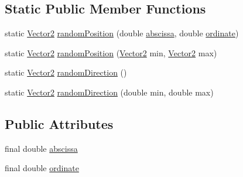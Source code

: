 \subsection*{Static Public Member Functions}
\begin{DoxyCompactItemize}
\item 
static \mbox{\hyperlink{class_vector2}{Vector2}} \mbox{\hyperlink{class_vector2_ac428f5ec5017a6c4a2ec850bcd95fea3}{random\+Position}} (double \mbox{\hyperlink{class_vector2_aadec5169cf1887537f1c7d60f87e137f}{abscissa}}, double \mbox{\hyperlink{class_vector2_a11433891ace979aadcb1c8c8612c29a3}{ordinate}})
\item 
static \mbox{\hyperlink{class_vector2}{Vector2}} \mbox{\hyperlink{class_vector2_af7e6ce10063a75db5bba6eac52dfe790}{random\+Position}} (\mbox{\hyperlink{class_vector2}{Vector2}} min, \mbox{\hyperlink{class_vector2}{Vector2}} max)
\item 
static \mbox{\hyperlink{class_vector2}{Vector2}} \mbox{\hyperlink{class_vector2_a139f45c8088a42e3971e6614aa62a8aa}{random\+Direction}} ()
\item 
static \mbox{\hyperlink{class_vector2}{Vector2}} \mbox{\hyperlink{class_vector2_abf982a5300ee21200b1021e27de420ab}{random\+Direction}} (double min, double max)
\end{DoxyCompactItemize}
\subsection*{Public Attributes}
\begin{DoxyCompactItemize}
\item 
final double \mbox{\hyperlink{class_vector2_aadec5169cf1887537f1c7d60f87e137f}{abscissa}}
\item 
final double \mbox{\hyperlink{class_vector2_a11433891ace979aadcb1c8c8612c29a3}{ordinate}}
\end{DoxyCompactItemize}
